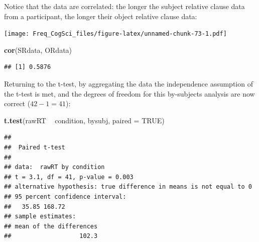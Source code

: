 \documentclass[12pt,]{krantz}
\newenvironment{Shaded}{\begin{snugshade}}{\end{snugshade}}
\newcommand{\DataTypeTok}[1]{\textcolor[rgb]{0.13,0.29,0.53}{#1}}
\newcommand{\KeywordTok}[1]{\textcolor[rgb]{0.13,0.29,0.53}{\textbf{#1}}}
\newcommand{\NormalTok}[1]{#1}
\newcommand{\OperatorTok}[1]{\textcolor[rgb]{0.81,0.36,0.00}{\textbf{#1}}}
\newcommand{\OtherTok}[1]{\textcolor[rgb]{0.56,0.35,0.01}{#1}}
\newcommand{\StringTok}[1]{\textcolor[rgb]{0.31,0.60,0.02}{#1}}
\begin{document}
Notice that the data are correlated: the longer the subject relative clause data from a participant, the longer their object relative clause data:

\begin{Shaded}
\end{Shaded}

\texttt{[image: Freq\_CogSci\_files/figure-latex/unnamed-chunk-73-1.pdf]}

\begin{Shaded}
\begin{Highlighting}[]
\KeywordTok{cor}\NormalTok{(SRdata, ORdata)}
\end{Highlighting}
\end{Shaded}

\begin{verbatim}
## [1] 0.5876
\end{verbatim}

Returning to the t-test, by aggregating the data the independence assumption of the t-test is met, and the degrees of freedom for this by-subjects analysis are now correct (\(42-1=41\)):

\begin{Shaded}
\begin{Highlighting}[]
\KeywordTok{t.test}\NormalTok{(rawRT }\OperatorTok{~}\StringTok{ }\NormalTok{condition, bysubj, }\DataTypeTok{paired =} \OtherTok{TRUE}\NormalTok{)}
\end{Highlighting}
\end{Shaded}

\begin{verbatim}
## 
## 	Paired t-test
## 
## data:  rawRT by condition
## t = 3.1, df = 41, p-value = 0.003
## alternative hypothesis: true difference in means is not equal to 0
## 95 percent confidence interval:
##   35.85 168.72
## sample estimates:
## mean of the differences 
##                   102.3
\end{verbatim}
\end{document}
